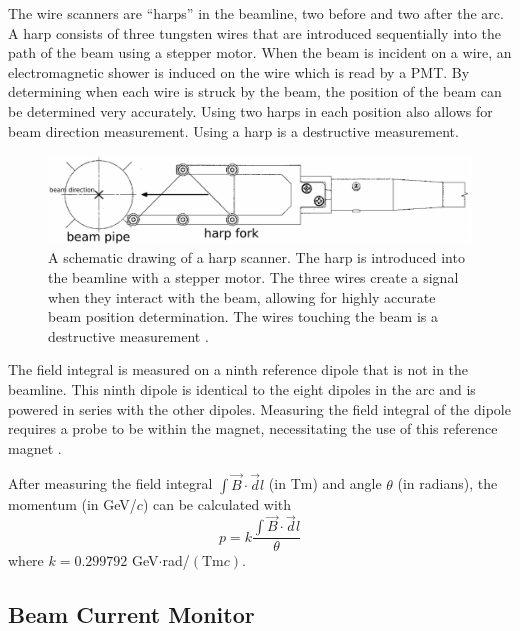 The wire scanners are ``harps'' in the beamline, two before and two after the arc. A harp consists of three tungsten wires that are introduced sequentially into the path of the beam using a stepper motor. When the beam is incident on a wire, an electromagnetic shower is induced on the wire which is read by a PMT. By determining when each wire is struck by the beam, the position of the beam can be determined very accurately. Using two harps in each position also allows for beam direction measurement. Using a harp is a destructive measurement. 

\begin{figure}[h]
\begin{center}
	\includegraphics[width=\textwidth]{./setup/fig/harp.png}
	\caption{A schematic drawing of a harp scanner. The harp is introduced into the beamline with a stepper motor. The three wires create a signal when they interact with the beam, allowing for highly accurate beam position determination. The wires touching the beam is a destructive measurement \cite{harp_schem}.}
\end{center}
\end{figure}

The field integral is measured on a ninth reference dipole that is not in the beamline. This ninth dipole is identical to the eight dipoles in the arc and is powered in series with the other dipoles. Measuring the field integral of the dipole requires a probe to be within the magnet, necessitating the use of this reference magnet \cite{HASEM}.

After measuring the field integral $\int\vec{B}\cdot\vec{d}l$ (in Tm) and angle $\theta$ (in radians), the momentum (in GeV/$c$) can be calculated with
\begin{equation}
	p = k\frac{\int\vec{B}\cdot\vec{d}l}{\theta}
\end{equation}
where $k=0.299792$ GeV$\cdot$rad/$\left(\text{Tm}c\right)$.

\subsection{Beam Current Monitor}

